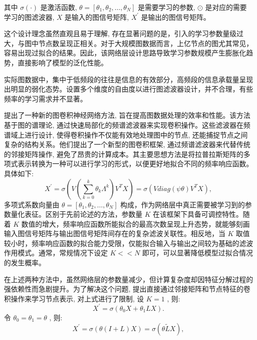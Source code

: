 其中 \(\sigma \left( \cdot \right)\) 是激活函数, \(\theta  = \left\lbrack  {{\theta }_{1}, {\theta }_{2}, \ldots , {\theta }_{N}}\right\rbrack\) 是需要学习的参数, \(\odot\) 是对应的需要学习的图滤波器, \({X}\) 是输入的图信号矩阵, \({{X}}^{\prime }\) 是输出的图信号矩阵。

这个设计理念虽然直观且易于理解, 存在显著问题的是，引入的学习参数量级过大，与图中节点数呈现正相关。对于大规模图数据而言，上亿节点的图尤其常见，容易出现过拟合的结果。因此，该网络层设计思路导致学习参数规模产生膨胀化趋势，直接影响了模型的泛化性能。

实际图数据中，集中于低频段的往往是信息的有效部分，高频段的信息承载量呈现出明显的弱化态势。设置多个维度的自由度以进行图滤波器设计，并不合理，有些频率的学习需求并不显著。

\textcite{2016_Defferrard_Convolutional_neural_networks_on_graphs_with_fast_localized_spectral_filtering} 提出了一种新的图卷积神经网络方法, 旨在提高图数据处理的效率和性能。该方法基于图的谱理论, 通过快速局部化的频谱滤波器来实现卷积操作。这些滤波器在频谱域上进行设计, 使得卷积操作不仅能有效地处理图中的节点, 还能捕捉节点之间复杂的结构关系。他们提出了一个新型的图卷积框架, 通过频谱滤波器来代替传统的邻接矩阵操作, 避免了昂贵的计算成本。其主要思想方法是将拉普拉斯矩阵的多项式表示转换为一种可以进行学习的形式，以便更好地拟合不同的频率响应函数。具体如下:
\[
{X}^{\prime } = \sigma \left( {V\left( {\mathop{\sum }\limits_{{k = 0}}^{k}{\theta }_{k}{\Lambda }^{k}}\right) {V}^{T}X}\right)  = \sigma \left( {{Vdiag}\left( {\psi \theta }\right) {V}^{T}X}\right), 
\]
多项式系数向量由 \(\theta = \left\lbrack {{\theta }_{1}, {\theta }_{2}, \ldots , {\theta }_{N}}\right\rbrack\) 构成，作为网络层中真正需要被学习到的参数量化表征。区别于先前论述的方法，参数量 \({K}\) 在该框架下具备可调控特性。随着 \({K}\) 数值的增大，频率响应函数所能拟合的最高次数呈现上升态势，就能够刻画输入图信号矩阵与输出图信号矩阵间存在的复杂滤波关联性。相反地，当 \({K}\) 取值较小时，频率响应函数的拟合能力受限，仅能拟合输入与输出之间较为基础的滤波作用模式。通常，常规情况下设定 \({K} < < {N}\) 即可，可以显著降低模型过拟合情况的发生概率。

在上述两种方法中，虽然网络层的参数量减少，但计算复杂度却因特征分解过程的强依赖性而急剧提升。为了解决这个问题, \textcite{2016_Kipf_Semi_supervised_classification_with_graph_convolutionalnetworks} 提出直接通过邻接矩阵和节点特征的卷积操作来学习节点表示, 对上式进行了限制, 设 \({K} = 1\) , 则:
\[
{X}^{\prime } = \sigma \left( {{\theta }_{0}X + {\theta }_{1}{LX}}\right).
\]
令 \({\theta }_{0} = {\theta }_{1} = \theta\) , 则:
\[
{{X}}^{\prime } = \sigma \left( {\theta \left( {{I} + {L}}\right) {X}}\right)  = \sigma \left( {\theta \widetilde{{L}}{X}}\right), 
\]

